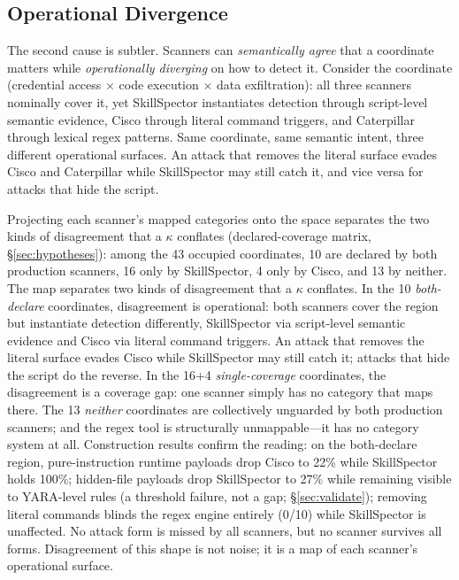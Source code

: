 \documentclass[sigconf,nonacm]{acmart}
\begin{document}
\subsection{Operational Divergence}
The second cause is subtler. Scanners can \emph{semantically agree} that a coordinate matters while \emph{operationally diverging} on how to detect it. Consider the coordinate (credential access $\times$ code execution $\times$ data exfiltration): all three scanners nominally cover it, yet SkillSpector instantiates detection through script-level semantic evidence, Cisco through literal command triggers, and Caterpillar through lexical regex patterns. Same coordinate, same semantic intent, three different operational surfaces. An attack that removes the literal surface evades Cisco and Caterpillar while SkillSpector may still catch it, and vice versa for attacks that hide the script.

Projecting each scanner's mapped categories onto the space separates the two kinds of disagreement that a $\kappa$ conflates (declared-coverage matrix, \S\ref{sec:hypotheses}): among the 43 occupied coordinates, 10 are declared by both production scanners, 16 only by SkillSpector, 4 only by Cisco, and 13 by neither. The map separates two kinds of disagreement that a $\kappa$ conflates. In the 10 \emph{both-declare} coordinates, disagreement is operational: both scanners cover the region but instantiate detection differently, SkillSpector via script-level semantic evidence and Cisco via literal command triggers. An attack that removes the literal surface evades Cisco while SkillSpector may still catch it; attacks that hide the script do the reverse. In the 16+4 \emph{single-coverage} coordinates, the disagreement is a coverage gap: one scanner simply has no category that maps there. The 13 \emph{neither} coordinates are collectively unguarded by both production scanners; and the regex tool is structurally unmappable---it has no category system at all. Construction results confirm the reading: on the both-declare region, pure-instruction runtime payloads drop Cisco to 22\% while SkillSpector holds 100\%; hidden-file payloads drop SkillSpector to 27\% while remaining visible to YARA-level rules (a threshold failure, not a gap; \S\ref{sec:validate}); removing literal commands blinds the regex engine entirely (0/10) while SkillSpector is unaffected. No attack form is missed by all scanners, but no scanner survives all forms. Disagreement of this shape is not noise; it is a map of each scanner's operational surface.
\end{document}
